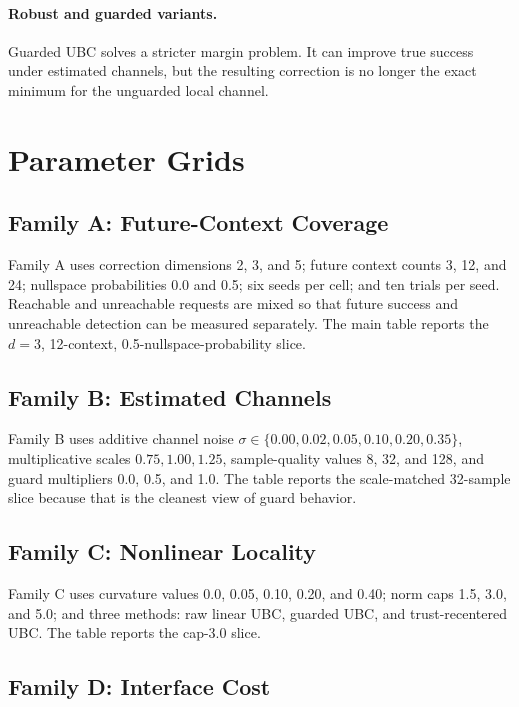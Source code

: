 \documentclass{article}
\begin{document}
\paragraph{Robust and guarded variants.}
Guarded UBC solves a stricter margin problem. It can improve true success under
estimated channels, but the resulting correction is no longer the exact minimum
for the unguarded local channel.

\section{Parameter Grids}

\subsection{Family A: Future-Context Coverage}

Family A uses correction dimensions 2, 3, and 5; future context counts 3, 12,
and 24; nullspace probabilities 0.0 and 0.5; six seeds per cell; and ten trials
per seed. Reachable and unreachable requests are mixed so that future success
and unreachable detection can be measured separately. The main table reports
the $d=3$, 12-context, 0.5-nullspace-probability slice.

\subsection{Family B: Estimated Channels}

Family B uses additive channel noise
$\sigma\in\{0.00,0.02,0.05,0.10,0.20,0.35\}$, multiplicative scales
$0.75,1.00,1.25$, sample-quality values 8, 32, and 128, and guard multipliers
0.0, 0.5, and 1.0. The table reports the scale-matched 32-sample slice because
that is the cleanest view of guard behavior.

\subsection{Family C: Nonlinear Locality}

Family C uses curvature values 0.0, 0.05, 0.10, 0.20, and 0.40; norm caps 1.5,
3.0, and 5.0; and three methods: raw linear UBC, guarded UBC, and
trust-recentered UBC. The table reports the cap-3.0 slice.

\subsection{Family D: Interface Cost}
\end{document}
